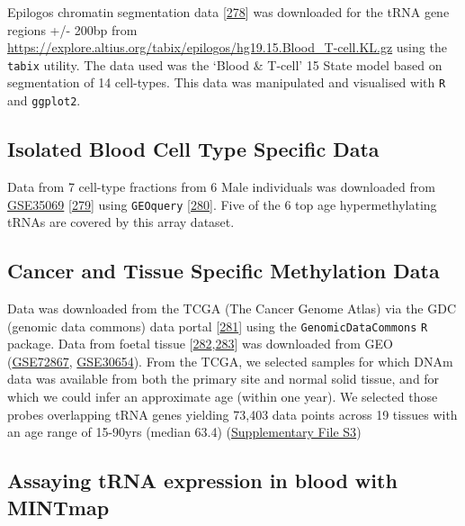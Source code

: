 \documentclass[
]{book}
\begin{document}
Epilogos chromatin segmentation data {[}\protect\hyperlink{ref-Meuleman2019}{278}{]} was downloaded for the tRNA gene regions +/- 200bp from \url{https://explore.altius.org/tabix/epilogos/hg19.15.Blood_T-cell.KL.gz} using the \texttt{tabix} utility.
The data used was the `Blood \& T-cell' 15 State model based on segmentation of 14 cell-types.
This data was manipulated and visualised with \texttt{R} and \texttt{ggplot2}.

\hypertarget{sortedbloodmethods}{%
\subsection{Isolated Blood Cell Type Specific Data}\label{sortedbloodmethods}}

Data from 7 cell-type fractions from 6 Male individuals was downloaded from \href{https://www.ncbi.nlm.nih.gov/geo/query/acc.cgi?acc=GSE35069}{GSE35069} {[}\protect\hyperlink{ref-Reinius2012}{279}{]} using \texttt{GEOquery} {[}\protect\hyperlink{ref-Davis2007p}{280}{]}.
Five of the 6 top age hypermethylating tRNAs are covered by this array dataset.

\hypertarget{TCGAmethods}{%
\subsection{Cancer and Tissue Specific Methylation Data}\label{TCGAmethods}}

Data was downloaded from the TCGA (The Cancer Genome Atlas) via the GDC (genomic data commons) data portal {[}\protect\hyperlink{ref-Grossman2016}{281}{]} using the \texttt{GenomicDataCommons} \texttt{R} package.
Data from foetal tissue {[}\protect\hyperlink{ref-Yang2016}{282},\protect\hyperlink{ref-Nazor2012}{283}{]} was downloaded from GEO (\href{https://www.ncbi.nlm.nih.gov/geo/query/acc.cgi?acc=GSE72867}{GSE72867}, \href{https://www.ncbi.nlm.nih.gov/geo/query/acc.cgi?acc=GSE30654}{GSE30654}).
From the TCGA, we selected samples for which DNAm data was available from both the primary site and normal solid tissue, and for which we could infer an approximate age (within one year).
We selected those probes overlapping tRNA genes yielding 73,403 data points across 19 tissues with an age range of 15-90yrs (median 63.4) (\href{./Supplementary_Files/TCGA_samples_used.tsv}{Supplementary File S3})

\hypertarget{mintmapmethods}{%
\subsection{Assaying tRNA expression in blood with MINTmap}\label{mintmapmethods}}
\end{document}
